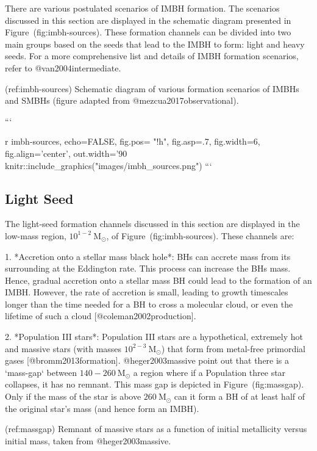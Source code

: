 There are various postulated scenarios of IMBH formation. 
The scenarios
discussed in this section are displayed in the schematic diagram
presented in Figure~\@ref(fig:imbh-sources). 
These formation channels
can be divided into two main groups based on the seeds that lead to the
IMBH to form: light and heavy seeds. 
For a more comprehensive list and
details of IMBH formation scenarios, refer to @van2004intermediate.

(ref:imbh-sources) Schematic diagram of various formation scenarios of IMBHs and SMBHs (figure adapted from @mezcua2017observational).

```{r imbh-sources, echo=FALSE, fig.pos= "!h", fig.asp=.7, fig.width=6, fig.align='center', out.width='90%
knitr::include_graphics("images/imbh_sources.png")
```


\subsection{Light Seed}

The light-seed formation channels discussed in this section are
displayed in the low-mass region, $10^{1-2} \ \text{M}_{\odot}$, of
Figure~\@ref(fig:imbh-sources). These channels are:


1. *Accretion onto a stellar mass black hole*:
    BHs can accrete mass from its surrounding at the Eddington rate.
    This process can increase the BHs mass. Hence, gradual accretion
    onto a stellar mass BH could lead to the formation of an IMBH.
    However, the rate of accretion is small, leading to growth timescales
    longer than the time needed for a BH to cross a molecular
    cloud, or even the lifetime of such a cloud [@coleman2002production].


2. *Population III stars*:
    Population III stars are a hypothetical, extremely hot and massive stars
    (with masses $10^{2-3}\ \text{M}_{\odot}$) that form from metal-free
    primordial gases [@bromm2013formation]. @heger2003massive point out that
    there is a `mass-gap` between $140-260 \ \text{M}_{\odot}$ a region
    where if a Population three star collapses, it has no remnant. This mass
    gap is depicted in Figure~\@ref(fig:massgap). Only if the mass of the
    star is above $260 \ \text{M}_{\odot}$ can it form a BH of at
    least half of the original star's mass (and hence form an IMBH).

(ref:massgap) Remnant of massive stars as a function of initial metallicity versus initial mass, taken from @heger2003massive.

}
